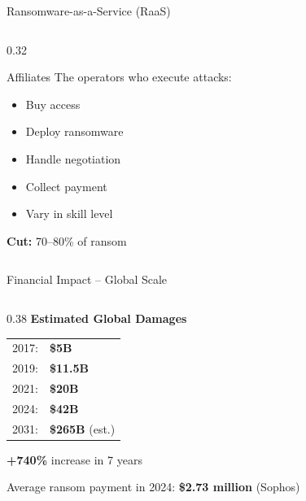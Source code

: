 \documentclass[aspectratio=169]{beamer}
\begin{document}
\begin{frame}{Ransomware-as-a-Service (RaaS)}
\begin{columns}[T]
\begin{column}{0.32\textwidth}
\begin{block}{Affiliates}
        \footnotesize
        The operators who execute attacks:
        \begin{itemize}
          \item Buy access
          \item Deploy ransomware
          \item Handle negotiation
          \item Collect payment
          \item Vary in skill level
        \end{itemize}
        \textbf{Cut:} 70--80\% of ransom
      \end{block}
    \end{column}
  \end{columns}
\end{frame}

\begin{frame}{Financial Impact -- Global Scale}
  \begin{columns}[T]
    \begin{column}{0.38\textwidth}
      \textbf{Estimated Global Damages}
      \vspace{0.5em}

      \begin{tabular}{ll}
        2017: & \textbf{\$5B}\\
        2019: & \textbf{\$11.5B}\\
        2021: & \textbf{\$20B}\\
        2024: & \textbf{\$42B}\\
        2031: & \textbf{\$265B} (est.)\\
      \end{tabular}

      \vspace{0.8em}
      \textcolor{accentred}{\textbf{+740\%}} increase in 7 years

      \vspace{0.5em}
      \footnotesize
      Average ransom payment in 2024: \textbf{\$2.73 million} (Sophos)


\end{column}
\end{columns}
\end{frame}
\end{document}
